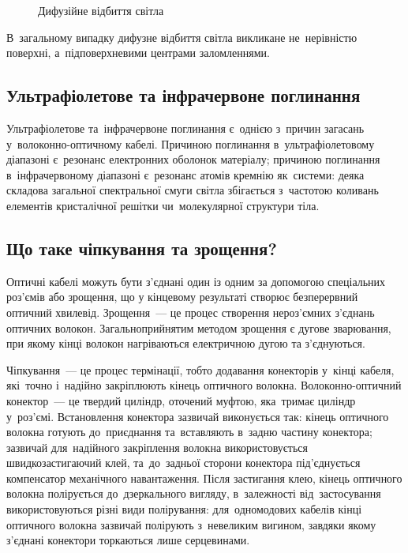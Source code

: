 \documentclass[
	a4paper,
	oneside,
	BCOR = 10mm,
	DIV = 12,
	12pt,
	headings = normal,
]{scrartcl}
\begin{document}
\begin{figure}[!htbp]
\begin{subfigure}{0.5\textwidth}
					\caption{}
					\label{subfig:diffuse-reflection-subsurface}
				\end{subfigure}
				\caption{Дифузійне відбиття світла}
				\label{fig:diffuse-reflection}
			\end{figure}

			В~загальному випадку дифузне відбиття світла викликане не~нерівністю поверхні, а~підповерхневими центрами заломленнями.

		\subsection{Ультрафіолетове та інфрачервоне поглинання}
			Ультрафіолетове та~інфрачервоне поглинання є~однією з~причин загасань у~волоконно-оптичному кабелі. Причиною поглинання в~ультрафіолетовому діапазоні є~резонанс електронних оболонок матеріалу; причиною поглинання в~інфрачервоному діапазоні є~резонанс атомів кремнію як~системи: деяка складова загальної спектральної смуги світла збігається з~частотою коливань елементів кристалічної решітки чи~молекулярної структури тіла.

		\subsection{Що таке чіпкування та зрощення?}
			Оптичні кабелі можуть бути з'єднані один із одним за допомогою спеціальних роз'ємів або зрощення, що у кінцевому результаті створює безперервний оптичний хвилевід. Зрощення~— це процес створення нероз'ємних з'єднань оптичних волокон. Загальноприйнятим методом зрощення є дугове зварювання, при якому кінці волокон нагріваються електричною дугою та з'єднуються.

			Чіпкування~— це процес термінації, тобто додавання конекторів у~кінці кабеля, які~точно і~надійно закріплюють кінець оптичного волокна. Волоконно-оптичний конектор~— це твердий циліндр, оточений муфтою, яка~тримає циліндр у~роз'ємі. Встановлення конектора зазвичай виконується так: кінець оптичного волокна готують до~приєднання та~вставляють в~задню частину конектора; зазвичай для~надійного закріплення волокна використовується швидкозастигаючий клей, та~до~задньої сторони конектора під'єднується компенсатор механічного навантаження. Після застигання клею, кінець оптичного волокна полірується до~дзеркального вигляду, в~залежності від~застосування використовуються різні види полірування: для~одномодових кабелів кінці оптичного волокна зазвичай полірують з~невеликим вигином, завдяки якому з'єднані конектори торкаються лише серцевинами.
\end{document}
